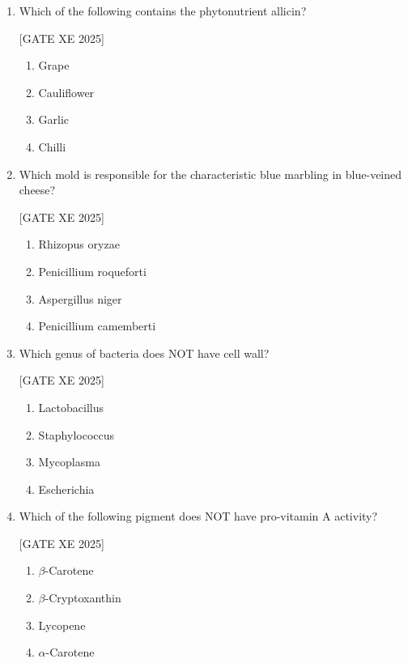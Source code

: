 \documentclass[journal,12pt,onecolumn]{IEEEtran}
\theoremstyle{remark}
\begin{document}
\begin{enumerate}
\hfill[GATE XE 2025]

\item Which of the following contains the phytonutrient allicin?

\hfill[GATE XE 2025]

\begin{multicols}{2}
\begin{enumerate}
\item Grape
\item Cauliflower
\item Garlic
\item Chilli
\end{enumerate}
\end{multicols}

\item Which mold is responsible for the characteristic blue marbling in blue-veined cheese?

\hfill[GATE XE 2025]

\begin{multicols}{2}
\begin{enumerate}
\item Rhizopus oryzae
\item Penicillium roqueforti
\item Aspergillus niger
\item Penicillium camemberti
\end{enumerate}
\end{multicols}

\item Which genus of bacteria does NOT have cell wall?

\hfill[GATE XE 2025]

\begin{multicols}{2}
\begin{enumerate}
\item Lactobacillus
\item Staphylococcus
\item Mycoplasma
\item Escherichia
\end{enumerate}
\end{multicols}

\item Which of the following pigment does NOT have pro-vitamin A activity?

\hfill[GATE XE 2025]

\begin{multicols}{2}
\begin{enumerate}
\item $\beta$-Carotene
\item $\beta$-Cryptoxanthin
\item Lycopene
\item $\alpha$-Carotene
\end{enumerate}
\end{multicols}


\end{enumerate}
\end{document}
